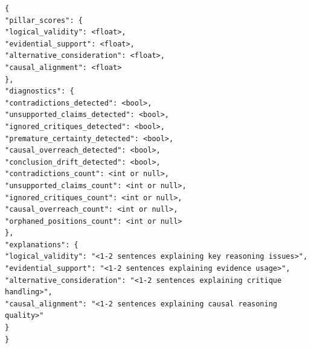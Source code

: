 \documentclass{article}
\begin{document}
\begin{lstlisting}[backgroundcolor=\color{promptbg}]
{
"pillar_scores": {
"logical_validity": <float>,
"evidential_support": <float>,
"alternative_consideration": <float>,
"causal_alignment": <float>
},
"diagnostics": {
"contradictions_detected": <bool>,
"unsupported_claims_detected": <bool>,
"ignored_critiques_detected": <bool>,
"premature_certainty_detected": <bool>,
"causal_overreach_detected": <bool>,
"conclusion_drift_detected": <bool>,
"contradictions_count": <int or null>,
"unsupported_claims_count": <int or null>,
"ignored_critiques_count": <int or null>,
"causal_overreach_count": <int or null>,
"orphaned_positions_count": <int or null>
},
"explanations": {
"logical_validity": "<1-2 sentences explaining key reasoning issues>",
"evidential_support": "<1-2 sentences explaining evidence usage>",
"alternative_consideration": "<1-2 sentences explaining critique handling>",
"causal_alignment": "<1-2 sentences explaining causal reasoning quality>"
}
}

\end{lstlisting}
\end{document}

